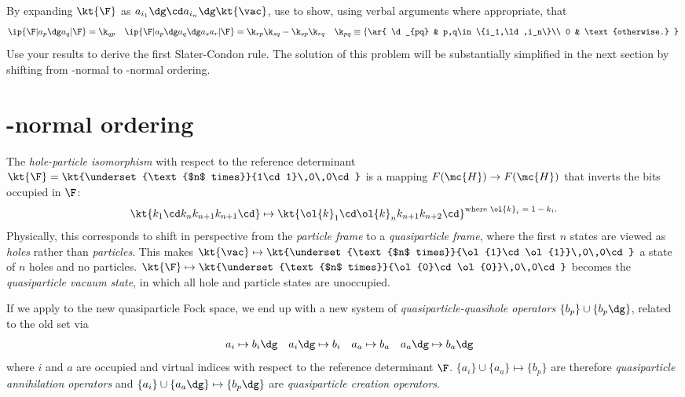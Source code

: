 \documentclass[11pt,fleqn]{article}
\numberwithin{equation}{section}
\begin{document}
\begin{prob}
By expanding $\kt{\F}$ as $a_{i_1}\dg\cd a_{i_n}\dg\kt{\vac}$, use  to show, using verbal arguments where appropriate, that
\begin{align*}
  \ip{\F|a_p\dg a_q|\F}
=
  \k_{qp}
&&
  \ip{\F|a_p\dg a_q\dg a_sa_r|\F}
=
  \k_{rp}\k_{sq}
-
  \k_{sp}\k_{rq}
&&
  \k_{pq}
\equiv
  \left\{\ar{
    \d_{pq} & p,q\in\{i_1,\ld,i_n\}\\
    0       & \text{otherwise.}
  }\right.
\end{align*}
Use your results to derive the first Slater-Condon rule.
The solution of this problem will be substantially simplified in the next section by shifting from \vac-normal to \F-normal ordering.
\end{prob}


\section{\F-normal ordering}

\begin{dfn} \label{hole-particle-isomorphism}
The \textit{hole-particle isomorphism} with respect to the reference determinant $\kt{\F}=\kt{\underset{\text{$n$ times}}{1\cd1}\,0\,0\cd}$ is a mapping $F(\mc{H})\rightarrow F(\mc{H})$ that inverts the bits occupied in $\F$:
\begin{align*}
  \kt{k_1\cd k_nk_{n+1}k_{n+1}\cd}
\mapsto
  \kt{\ol{k}_1\cd \ol{k}_nk_{n+1}k_{n+2}\cd}
\sp
  \text{where $\ol{k}_i=1-k_i$.}
\end{align*}
Physically, this corresponds to shift in perspective from the \textit{particle frame} to a \textit{quasiparticle frame}, where the first $n$ states are viewed as \textit{holes} rather than \textit{particles}.
This makes $\kt{\vac}\mapsto\kt{\underset{\text{$n$ times}}{\ol{1}\cd\ol{1}}\,0\,0\cd}$ a state of $n$ holes and no particles.  $\kt{\F}\mapsto\kt{\underset{\text{$n$ times}}{\ol{0}\cd\ol{0}}\,0\,0\cd}$ becomes the \textit{quasiparticle vacuum state}, in which all hole and particle states are unoccupied.
\end{dfn}

\begin{dfn}
If we apply  to the new quasiparticle Fock space, we end up with a new system of \textit{quasiparticle-quasihole operators} $\{b_p\}\cup\{b_p\dg\}$, related to the old set via
\begin{align}
&&
  a_i
\mapsto
  b_i\dg
&&
  a_i\dg
\mapsto
  b_i
&&
  a_a
\mapsto
  b_a
&&
  a_a\dg
\mapsto
  b_a\dg
\end{align}
where $i$ and $a$ are occupied and virtual indices with respect to the reference determinant $\F$.
$\{a_i\}\cup\{a_a\}\mapsto\{b_p\}$ are therefore \textit{quasiparticle annihilation operators} and $\{a_i\}\cup\{a_a\dg\}\mapsto\{b_p\dg\}$ are \textit{quasiparticle creation operators}.
\end{dfn}
\end{document}
